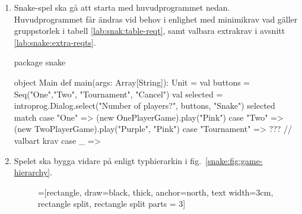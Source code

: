 \begin{enumerate}[label={$\square$}, leftmargin=*]

\item Snake-spel ska gå att starta med huvudprogrammet nedan. Huvudprogrammet får ändras vid behov i enlighet med minimikrav vad gäller gruppstorlek i tabell \ref{lab:snak:table-reqt}, samt valbara extrakrav i avsnitt \ref{lab:snake:extra-reqts}.
\begin{Code}
package snake

object Main {
  def main(args: Array[String]): Unit = {
    val buttons = Seq("One","Two", "Tournament", "Cancel")
    val selected =
      introprog.Dialog.select("Number of players?", buttons, "Snake")
    selected match {
      case "One" => (new OnePlayerGame).play("Pink")
      case "Two" => (new TwoPlayerGame).play("Purple", "Pink")
      case "Tournament" => ??? // valbart krav
      case _ =>
    }
  }
}
\end{Code}

\item Spelet ska bygga vidare på  enligt typhierarkin i fig.~\ref{snake:fig:game-hierarchy}.

\begin{figure}[H]
\begin{center}
\newcommand{\TextBox}[1]{\raisebox{0pt}[1em][0.5em]{#1}}
=[rectangle, draw=black,  thick, anchor=north, text width=3cm, rectangle split, rectangle split parts = 3]
\end{center}
\end{figure}
\end{enumerate}
